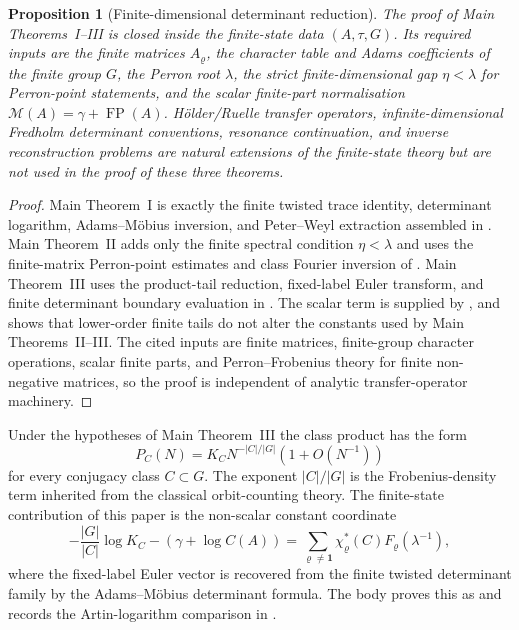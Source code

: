\documentclass[11pt,a4paper]{amsart}
\theoremstyle{plain}
\newtheorem{proposition}[theorem]{Proposition}
\theoremstyle{definition}
\theoremstyle{remark}
\DeclareMathOperator{\FP}{FP}
\begin{document}
\begin{proposition}[Finite-dimensional determinant reduction]
  \label{rem:intro-finite-state-transfer-split}
  The proof of Main Theorems~I--III is closed inside the finite-state data
  \((A,\tau,G)\).  Its required inputs are the finite matrices
  \(A_\varrho\), the character table and Adams coefficients of the finite group
  \(G\), the Perron root \(\lambda\), the strict finite-dimensional gap
  \(\eta<\lambda\) for Perron-point statements, and the scalar finite-part
  normalisation \(\mathcal M(A)=\gamma+\FP(A)\).  H\"older/Ruelle transfer
  operators, infinite-dimensional Fredholm determinant conventions, resonance
  continuation, and inverse reconstruction problems are natural extensions of
  the finite-state theory but are not used in the proof of these three
  theorems.
\end{proposition}
\begin{proof}
  Main Theorem~I is exactly the finite twisted trace identity, determinant
  logarithm, Adams--M\"obius inversion, and Peter--Weyl extraction assembled in
  .  Main Theorem~II adds only the
  finite spectral condition \(\eta<\lambda\) and uses the finite-matrix
  Perron-point estimates and class Fourier inversion of
  .
  Main Theorem~III uses the product-tail reduction, fixed-label Euler transform,
  and finite determinant boundary evaluation in
  .
  The scalar term is supplied by , and
   shows that lower-order finite tails do
  not alter the constants used by Main Theorems~II--III.  The cited inputs are
  finite matrices, finite-group character operations, scalar finite parts, and
  Perron--Frobenius theory for finite non-negative matrices, so the proof is
  independent of analytic transfer-operator machinery.
\end{proof}

Under the hypotheses of Main Theorem~III the class product has the form
\[
  P_C(N)=K_C N^{-|C|/|G|}(1+O(N^{-1}))
\]
for every conjugacy class \(C\subset G\).  The exponent \(|C|/|G|\) is the
Frobenius-density term inherited from the classical orbit-counting theory.  The
finite-state contribution of this paper is the non-scalar constant coordinate
\[
  -\frac{|G|}{|C|}\log K_C-(\gamma+
  \log C(A))
  =
  \sum_{\varrho\ne\mathbf1}
    \chi_\varrho^\ast(C)F_\varrho(\lambda^{-1}),
\]
where the fixed-label Euler vector is recovered from the finite twisted
determinant family by the Adams--M\"obius determinant formula.  The body proves
this as  and records the Artin-logarithm
comparison in .
\end{document}
